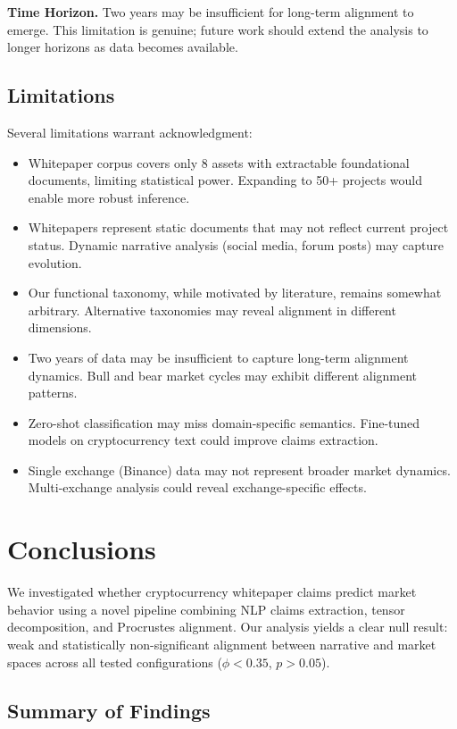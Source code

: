 \documentclass[11pt,twocolumn]{article}
\begin{document}
\textbf{Time Horizon.} Two years may be insufficient for long-term alignment to emerge. This limitation is genuine; future work should extend the analysis to longer horizons as data becomes available.

\subsection{Limitations}

Several limitations warrant acknowledgment:
\begin{itemize}
    \item Whitepaper corpus covers only 8 assets with extractable foundational documents, limiting statistical power. Expanding to 50+ projects would enable more robust inference.
    \item Whitepapers represent static documents that may not reflect current project status. Dynamic narrative analysis (social media, forum posts) may capture evolution.
    \item Our functional taxonomy, while motivated by literature, remains somewhat arbitrary. Alternative taxonomies may reveal alignment in different dimensions.
    \item Two years of data may be insufficient to capture long-term alignment dynamics. Bull and bear market cycles may exhibit different alignment patterns.
    \item Zero-shot classification may miss domain-specific semantics. Fine-tuned models on cryptocurrency text could improve claims extraction.
    \item Single exchange (Binance) data may not represent broader market dynamics. Multi-exchange analysis could reveal exchange-specific effects.
\end{itemize}

\section{Conclusions}
\label{sec:conclusion}

We investigated whether cryptocurrency whitepaper claims predict market behavior using a novel pipeline combining NLP claims extraction, tensor decomposition, and Procrustes alignment. Our analysis yields a clear null result: weak and statistically non-significant alignment between narrative and market spaces across all tested configurations ($\phi < 0.35$, $p > 0.05$).

\subsection{Summary of Findings}
\end{document}
